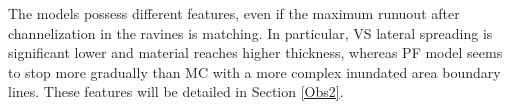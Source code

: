 \documentclass{article}
\begin{document}

The models possess different features, even if the maximum runuout after channelization in the ravines is matching. In particular, VS lateral spreading is significant lower and material reaches higher thickness, whereas PF model seems to stop more gradually than MC with a more complex inundated area boundary lines. These features will be detailed in Section \ref{Obs2}.
\end{document}
